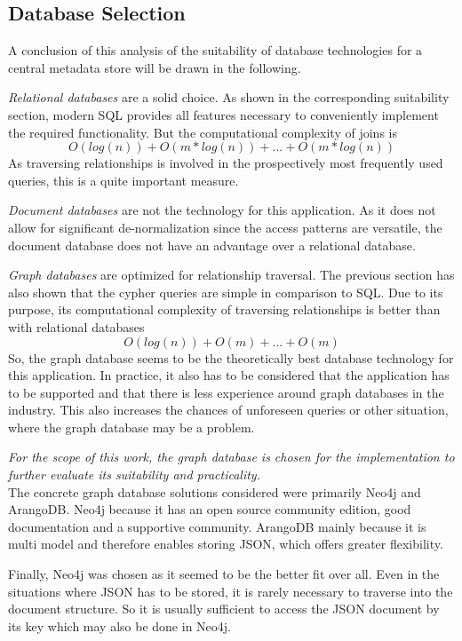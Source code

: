 \subsection{Database Selection}
A conclusion of this analysis of the suitability of database technologies for a central metadata store will be drawn in the following.\par  %
\emph{Relational databases} are a solid choice. As shown in the corresponding suitability section, modern SQL provides all features necessary to conveniently implement the required functionality. But the computational complexity of joins is 
$$O(log(n)) + O(m*log(n)) + ... + O(m*log(n))$$
As traversing relationships is involved in the prospectively most frequently used queries, this is a quite important measure.\par 
\emph{Document databases} are not the technology for this application. As it does not allow for significant de-normalization since the access patterns are versatile, the document database does not have an advantage over a relational database.\par 
\emph{Graph databases} are optimized for relationship traversal. The previous section has also shown that the cypher queries are simple in comparison to SQL. Due to its purpose, its computational complexity of traversing relationships is better than with relational databases
$$O(log(n)) + O(m) + ... + O(m)$$
So, the graph database seems to be the theoretically best database technology for this application. In practice, it also has to be considered that the application has to be supported and that there is less experience around graph databases in the industry. This also increases the chances of unforeseen queries or other situation, where the graph database may be a problem.\par 
\emph{For the scope of this work, the graph database is chosen for the implementation to further evaluate its suitability and practicality.}\\

The concrete graph database solutions considered were primarily Neo4j and ArangoDB. Neo4j because it has an open source community edition, good documentation and a supportive community. ArangoDB mainly because it is multi model and therefore enables storing JSON, which offers greater flexibility.\par 
Finally, Neo4j was chosen as it seemed to be the better fit over all. Even in the situations where JSON has to be stored, it is rarely necessary to traverse into the document structure. So it is usually sufficient to access the JSON document by its key which may also be done in Neo4j.

